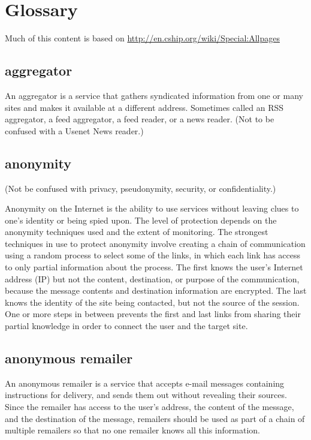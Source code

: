\section{Glossary}

Much of this content is based on
\href{http://en.cship.org/wiki/Special:Allpages}{http://en.cship.org/wiki/Special:Allpages}

\subsection{aggregator}

An aggregator is a service that gathers syndicated information from one
or many sites and makes it available at a different address. Sometimes
called an RSS aggregator, a feed aggregator, a feed reader, or a news
reader. (Not to be confused with a Usenet News reader.)

\subsection{anonymity}

(Not be confused with privacy, pseudonymity, security, or
confidentiality.)

Anonymity on the Internet is the ability to use services without leaving
clues to one's identity or being spied upon. The level of protection
depends on the anonymity techniques used and the extent of monitoring.
The strongest techniques in use to protect anonymity involve creating a
chain of communication using a random process to select some of the
links, in which each link has access to only partial information about
the process. The first knows the user's Internet address (IP) but not
the content, destination, or purpose of the communication, because the
message contents and destination information are encrypted. The last
knows the identity of the site being contacted, but not the source of
the session. One or more steps in between prevents the first and last
links from sharing their partial knowledge in order to connect the user
and the target site.

\subsection{anonymous remailer}

An anonymous remailer is a service that accepts e-mail messages
containing instructions for delivery, and sends them out without
revealing their sources. Since the remailer has access to the user's
address, the content of the message, and the destination of the message,
remailers should be used as part of a chain of multiple remailers so
that no one remailer knows all this information.

